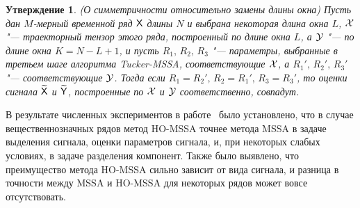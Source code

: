 \documentclass[specialist,
  substylefile = spbu.rtx,
subf,href,colorlinks=true, 12pt]{disser}
\theoremstyle{plain}
\newtheorem{statement}{Утверждение}[section]
\theoremstyle{definition}
\theoremstyle{remark}
\def\tmssa/{Tucker-MSSA}
\begin{document}
\begin{statement}
  \emph{(О симметричности относительно замены длины окна)}
  Пусть дан $M$-мерный временной ряд $\mathsf{X}$ длины $N$ и выбрана
  некоторая длина окна $L$,
  $\mathcal{X}$ "--- траекторный тензор этого ряда, построенный по
  длине окна $L$, а
  $\mathcal{Y}$ "--- по длине окна ${K = N - L + 1}$, и пусть
  $R_1,\, R_2,\, R_3$ "--- параметры, выбранные в третьем шаге
  алгоритма \tmssa/, соответствующие $\mathcal{X}$,
  а $R_1',\, R_2',\, R_3'$ "--- соответствующие $\mathcal{Y}$.
  Тогда если $R_1 = R_2',\, R_2 = R_1',\,  R_3 = R_3'$, то
  оценки сигнала $\widetilde{\mathsf{X}}$ и $\widetilde{\mathsf{Y}}$, построенные
  по $\mathcal{X}$ и $\mathcal{Y}$ соответственно,
  совпадут.
\end{statement}

В результате численных экспериментов в работе~\cite{Thesis2024} было
установлено, что в случае вещественнозначных рядов метод HO-MSSA
точнее метода MSSA в задаче выделения сигнала, оценки параметров
сигнала, и, при некоторых слабых условиях, в задаче разделения компонент.
Также было выявлено, что преимущество метода HO-MSSA сильно зависит
от вида сигнала, и разница в точности между MSSA и HO-MSSA для
некоторых рядов может вовсе отсутствовать.
\end{document}
